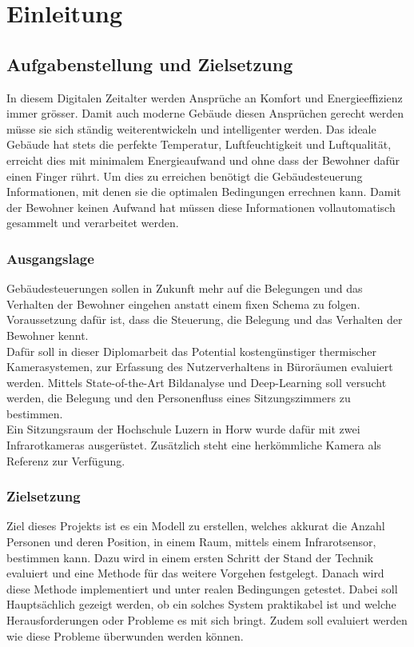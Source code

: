 \chapter{Einleitung}

\section{Aufgabenstellung und Zielsetzung}

In diesem Digitalen Zeitalter werden Ansprüche an Komfort und Energieeffizienz immer grösser. Damit auch moderne Gebäude diesen Ansprüchen gerecht werden müsse sie sich ständig weiterentwickeln und intelligenter werden. Das ideale Gebäude hat stets die perfekte Temperatur, Luftfeuchtigkeit und Luftqualität, erreicht dies mit minimalem Energieaufwand und ohne dass der Bewohner dafür einen Finger rührt. Um dies zu erreichen benötigt die Gebäudesteuerung Informationen, mit denen sie die optimalen Bedingungen errechnen kann. Damit der Bewohner keinen Aufwand hat müssen diese Informationen vollautomatisch gesammelt und verarbeitet werden.

\subsection{Ausgangslage}
\label{sec:Ausgangslage}

Gebäudesteuerungen sollen in Zukunft mehr auf die Belegungen und das Verhalten der Bewohner eingehen anstatt einem fixen Schema zu folgen. Voraussetzung dafür ist, dass die Steuerung, die Belegung und das Verhalten der Bewohner kennt.\\
Dafür soll in dieser Diplomarbeit das Potential kostengünstiger thermischer Kamerasystemen, zur Erfassung des Nutzerverhaltens in Büroräumen evaluiert werden. Mittels State-of-the-Art Bildanalyse und Deep-Learning soll versucht werden, die Belegung und den Personenfluss eines Sitzungszimmers zu bestimmen.\\
Ein Sitzungsraum der Hochschule Luzern in Horw wurde dafür mit zwei Infrarotkameras ausgerüstet. Zusätzlich steht eine herkömmliche Kamera als Referenz zur Verfügung.


\subsection{Zielsetzung}
\label{sec:Zielsetzung}

Ziel dieses Projekts ist es ein Modell zu erstellen, welches akkurat die Anzahl Personen und deren Position, in einem Raum, mittels einem Infrarotsensor, bestimmen kann. Dazu wird in einem ersten Schritt der Stand der Technik evaluiert und eine Methode für das weitere Vorgehen festgelegt. Danach wird diese Methode implementiert und unter realen Bedingungen getestet. Dabei soll Hauptsächlich gezeigt werden, ob ein solches System praktikabel ist und welche Herausforderungen oder Probleme es mit sich bringt. Zudem soll evaluiert werden wie diese Probleme überwunden werden können.

